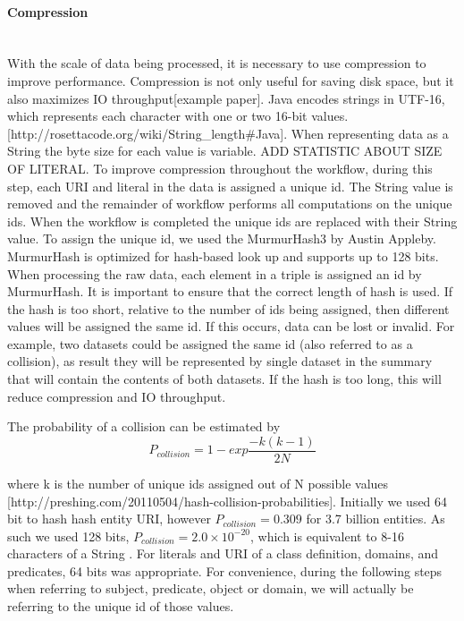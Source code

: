 \documentclass[11pt,onecolumn]{article}
\begin{document}
\paragraph{Compression} \\
With the scale of data being processed, it is necessary to use compression to improve performance. Compression is not only useful for saving disk space, but it also maximizes IO throughput[example paper].  Java encodes strings in UTF-16, which represents each character with one or two 16-bit values.[http://rosettacode.org/wiki/String\_length\#Java].  When representing data as a String the byte size for each value is variable.  ADD STATISTIC ABOUT SIZE OF LITERAL.  To improve compression throughout the workflow, during this step, each URI and literal in the data is assigned a unique id.  The String value is removed and the remainder of workflow performs all computations on the unique ids. When the workflow is completed the unique ids are replaced with their String value.  To assign the unique id, we used the MurmurHash3 by Austin Appleby.  MurmurHash is optimized for hash-based look up and supports up to 128 bits.  When processing the raw data, each element in a triple is assigned an id by MurmurHash.  It is important to ensure that the correct length of hash is used.  If the hash is too short, relative to the number of ids being assigned, then different values will be assigned  the same id.  If this occurs, data can be lost or invalid. For example, two datasets could be assigned the same id (also referred to as a collision), as result they will be represented by single dataset in the summary that will contain the contents of both datasets.  If the hash is too long, this will reduce compression and IO throughput.   

The probability of a collision can be estimated by 
\begin{equation}
P_{collision} = 1-exp{\frac{-k(k-1)}{2N}}
\end{equation}

where k is the number of unique ids assigned out of N possible values [http://preshing.com/20110504/hash-collision-probabilities]. Initially we used 64 bit to hash hash entity URI, however $P_{collision}=0.309$ for 3.7 billion entities.  As such we used 128 bits, $P_{collision}=2.0\times10^{-20}$, which is equivalent to  8-16 characters of a String .  For literals and URI of a class definition, domains, and predicates, 64 bits was appropriate.  For convenience, during the following steps when referring to subject, predicate, object or domain, we will actually be referring to the unique id of those values.\\
\end{document}
